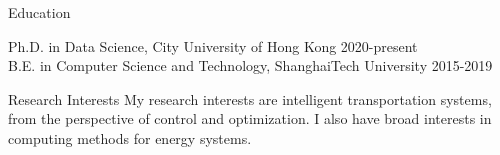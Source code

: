 \documentclass{resume} %
\begin{document}




\begin{rSection}{Education}

{Ph.D. in Data Science}, City University of Hong Kong  \hfill {2020-present}\\
{B.E. in Computer Science and Technology}, ShanghaiTech University \hfill {2015-2019}

\end{rSection}

\begin{rSection}{Research Interests}
    My research interests are intelligent transportation systems, from the perspective of control and optimization. I also have broad interests in computing methods for energy systems.
\end{rSection}
\end{document}
